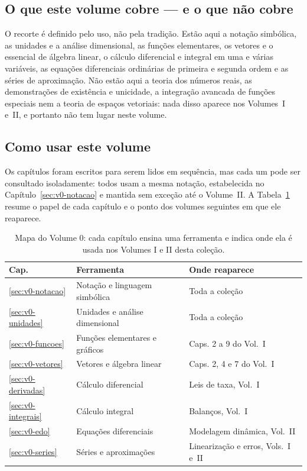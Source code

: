 \documentclass[12pt,a4paper]{article}
\numberwithin{equation}{section}
\numberwithin{table}{section}
\numberwithin{figure}{section}
\begin{document}
\subsection{O que este volume cobre --- e o que não cobre}

O recorte é definido pelo uso, não pela tradição. Estão aqui a notação
simbólica, as unidades e a análise dimensional, as funções elementares, os
vetores e o essencial de álgebra linear, o cálculo diferencial e integral em
uma e várias variáveis, as equações diferenciais ordinárias de primeira e
segunda ordem e as séries de aproximação. Não estão aqui a teoria dos
números reais, as demonstrações de existência e unicidade, a integração
avancada de funções especiais nem a teoria de espaços vetoriais: nada disso
aparece nos Volumes~I e~II, e portanto não tem lugar neste volume.

\subsection{Como usar este volume}

Os capítulos foram escritos para serem lidos em sequência, mas cada um pode
ser consultado isoladamente: todos usam a mesma notação, estabelecida no
Capítulo~\ref{sec:v0-notacao} e mantida sem exceção até o Volume~II. A
Tabela~\ref{tab:v0-c1-1} resume o papel de cada capítulo e o ponto dos
volumes seguintes em que ele reaparece.

\begin{table}[H]
\centering
\caption[Mapa do Volume 0 e suas pontes com os volumes I e II.]{%
Mapa do Volume 0: cada capítulo ensina uma ferramenta e indica onde ela é
usada nos Volumes I e II desta coleção.}
\label{tab:v0-c1-1}
\begin{tabularx}{\textwidth}{lXl}
\toprule
\textbf{Cap.} & \textbf{Ferramenta} & \textbf{Onde reaparece} \\
\midrule
\ref{sec:v0-notacao} & Notação e linguagem simbólica & Toda a coleção \\
\ref{sec:v0-unidades} & Unidades e análise dimensional & Toda a coleção \\
\ref{sec:v0-funcoes} & Funções elementares e gráficos & Caps. 2 a 9 do Vol.~I \\
\ref{sec:v0-vetores} & Vetores e álgebra linear & Caps. 2, 4 e 7 do Vol.~I \\
\ref{sec:v0-derivadas} & Cálculo diferencial & Leis de taxa, Vol.~I \\
\ref{sec:v0-integrais} & Cálculo integral & Balanços, Vol.~I \\
\ref{sec:v0-edo} & Equações diferenciais & Modelagem dinâmica, Vol.~II \\
\ref{sec:v0-series} & Séries e aproximações & Linearização e erros, Vols.~I e~II \\
\bottomrule
\end{tabularx}
\end{table}
\end{document}
